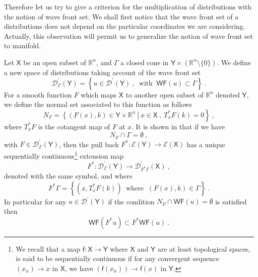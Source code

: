 \documentclass[11pt]{book}
\newcommand{\WF}{\mathsf{WF}}
\newcommand{\Dcal}{\mathcal{D}}
\newcommand{\Ecal}{\mathcal{E}}
\newcommand{\Rbb}{\mathbb{R}}
\newcommand{\Xsf}{\mathsf{X}}
\newcommand{\Ysf}{\mathsf{Y}}
\newcommand{\fsf}{\mathsf{f}}
\theoremstyle{break}
\begin{document}
\bigskip


Therefore let us try to give a criterion for the multiplication of distributions with the notion of wave front set. We shall first notice that the wave front set of a distributions does not depend on the particular coordinates we are considering. Actually, this observation will permit us to generalize the notion of wave front set to manifold.


\bigskip


Let $\Xsf$ be an open subset of $\Rbb^n$, and $\Gamma$ a closed cone in $\Ysf \times\left(\Rbb^n\setminus\{0\}\right)$. We define a new space of distributions taking account of the wave front set
%
\begin{equation*}
\Dcal^\prime_\Gamma(\Ysf) = \left\{ u \in \Dcal^\prime(\Ysf) \ , \ \mbox{ with } \ \WF(u) \subset \Gamma \right\} \ . 
\end{equation*}
%
For a smooth function $F$ which maps $\Xsf$ to another open subset of $\Rbb^n$ denoted $\Ysf$, we define the normal set associated to this function as follows
%
\begin{equation*}
N_F = \left. \left\{ (F(x),k) \in \Ysf \times \Rbb^n \ \right| \ x \in \Xsf \ , \ T^\ast_xF(k) = 0 \right\} \ , 
\end{equation*}
%
where $T^\ast_xF$ is the cotangent map of $F$ at $x$. It is shown in \cite[theorem 8.2.4]{HORMANDER_1990} that if we have
%
\begin{equation}
N_F \cap \Gamma = \emptyset \ , 
\label{eq:cond_pullback_wf}
\end{equation}
%
with $F \in \Dcal^\prime_\Gamma(\Ysf)$, then the pull back $F^\ast : \Ecal(\Ysf) \to \Ecal(\Xsf)$ has a unique sequentially continuous\footnote{We recall that a map $\fsf : \Xsf \to \Ysf$ where $\Xsf$ and $\Ysf$ are at least topological spaces, is said to be sequentially continuous if for any convergent sequence $(x_n) \to x$ in $\Xsf$, we have $(\fsf(x_n)) \to \fsf(x)$ in $\Ysf$.} extension map 
%
\begin{equation*}
F^\ast : \Dcal^\prime_\Gamma(\Ysf) \to \Dcal^\prime_{F^\ast\Gamma}(\Xsf) \ , 
\end{equation*}
%
denoted with the same symbol, and where
%
\begin{equation*}
F^\ast\Gamma = \left\{ \left(x , T^\ast_xF(k)\right) \ \mbox{ where } \ (F(x),k) \in \Gamma \right\} \ .
\end{equation*}
%
In particular for any $u \in \Dcal^\prime(\Ysf)$ if the condition $N_F \cap \WF(u) = \emptyset$ is satisfied then
%
\begin{equation*}
\WF(F^\ast u) \subset F^\ast \WF(u) \ .
\end{equation*}
\end{document}
